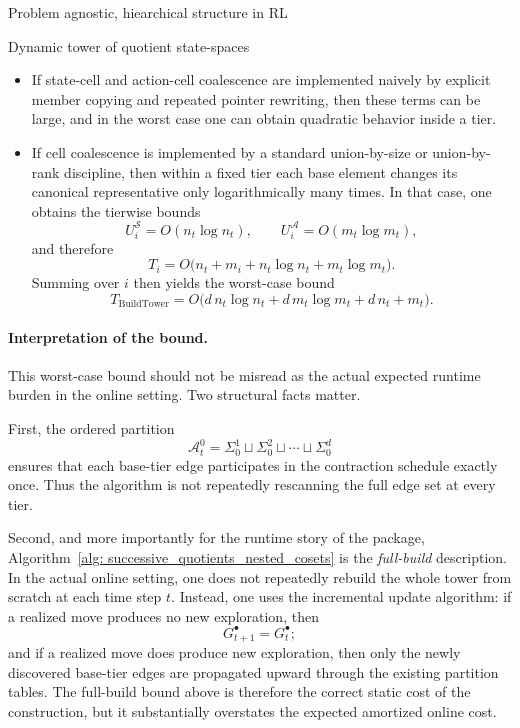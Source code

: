 \documentclass[11pt]{article}
\begin{document}
\begin{section}{Problem agnostic, hiearchical structure in RL}
\begin{subsection}{Dynamic tower of quotient state-spaces}
\begin{itemize}
    \item If state-cell and action-cell coalescence are implemented naively by explicit member copying and repeated pointer rewriting, then these terms can be large, and in the worst case one can obtain quadratic behavior inside a tier.

    \item If cell coalescence is implemented by a standard union-by-size or union-by-rank discipline, then within a fixed tier each base element changes its canonical representative only logarithmically many times. In that case, one obtains the tierwise bounds
    \[
    U_i^{\mathcal S}=O(n_t\log n_t),
    \qquad
    U_i^{\mathcal A}=O(m_t\log m_t),
    \]
    and therefore
    \[
    T_i
    =
    O\bigl(n_t + m_i + n_t\log n_t + m_t\log m_t\bigr).
    \]
    Summing over $i$ then yields the worst-case bound
    \[
    T_{\mathrm{BuildTower}}
    =
    O\bigl(
    d\,n_t\log n_t + d\,m_t\log m_t + d\,n_t + m_t
    \bigr).
    \]
\end{itemize}

\paragraph{Interpretation of the bound.}
This worst-case bound should not be misread as the actual expected runtime burden in the online setting. Two structural facts matter.

First, the ordered partition
\[
\mathcal{A}_t^0
=
\Sigma_0^1 \sqcup \Sigma_0^2 \sqcup \cdots \sqcup \Sigma_0^d
\]
ensures that each base-tier edge participates in the contraction schedule exactly once. Thus the algorithm is not repeatedly rescanning the full edge set at every tier.

Second, and more importantly for the runtime story of the package, Algorithm~\ref{alg: successive_quotients_nested_cosets} is the \emph{full-build} description. In the actual online setting, one does not repeatedly rebuild the whole tower from scratch at each time step $t$. Instead, one uses the incremental update algorithm: if a realized move produces no new exploration, then
\[
G_{t+1}^\bullet = G_t^\bullet;
\]
and if a realized move does produce new exploration, then only the newly discovered base-tier edges are propagated upward through the existing partition tables. The full-build bound above is therefore the correct static cost of the construction, but it substantially overstates the expected amortized online cost.


\end{subsection}
\end{section}
\end{document}
